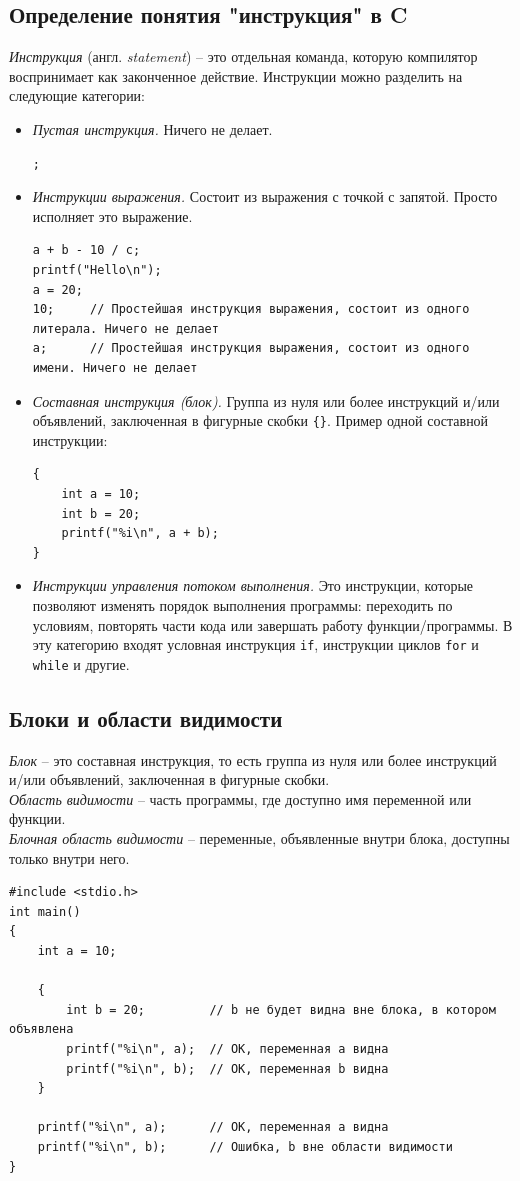 \documentclass[10pt]{article}
\begin{document}
\subsection*{Определение понятия "инструкция"{} в C}
\textit{Инструкция} (англ. \textit{statement}) -- это отдельная команда, которую компилятор воспринимает как законченное действие. Инструкции можно разделить на следующие категории:
\begin{itemize}
\item \textit{Пустая инструкция.} Ничего не делает.
\begin{lstlisting}
;
\end{lstlisting}

\item \textit{Инструкции выражения.} Состоит из выражения с точкой с запятой. Просто исполняет это выражение.
\begin{lstlisting}
a + b - 10 / c;
printf("Hello\n");
a = 20;
10;		// Простейшая инструкция выражения, состоит из одного литерала. Ничего не делает
a;		// Простейшая инструкция выражения, состоит из одного имени. Ничего не делает
\end{lstlisting}

\item \textit{Составная инструкция (блок).} Группа из нуля или более инструкций и/или объявлений, заключенная в фигурные скобки \texttt{\{\}}.
Пример одной составной инструкции:
\begin{lstlisting}
{
	int a = 10;
	int b = 20;
	printf("%i\n", a + b);
}
\end{lstlisting}

\item \textit{Инструкции управления потоком выполнения.} Это инструкции, которые позволяют изменять порядок выполнения программы: переходить по условиям, повторять части кода или завершать работу функции/программы. В эту категорию входят условная инструкция \texttt{if}, инструкции циклов \texttt{for} и \texttt{while} и другие.
\end{itemize}


\subsection*{Блоки и области видимости}
\textit{Блок} -- это составная инструкция, то есть группа из нуля или более инструкций и/или объявлений, заключенная в фигурные скобки.\\
\textit{Область видимости} -- часть программы, где доступно имя переменной или функции.\\
\textit{Блочная область видимости} -- переменные, объявленные внутри блока, доступны только внутри него.
\begin{lstlisting}
#include <stdio.h>
int main() 
{
    int a = 10;
    
    {
        int b = 20;			// b не будет видна вне блока, в котором объявлена
        printf("%i\n", a);  // ОК, переменная a видна
        printf("%i\n", b);  // ОК, переменная b видна
    }

    printf("%i\n", a);  	// ОК, переменная a видна
    printf("%i\n", b);  	// Ошибка, b вне области видимости
}
\end{lstlisting}
\end{document}
